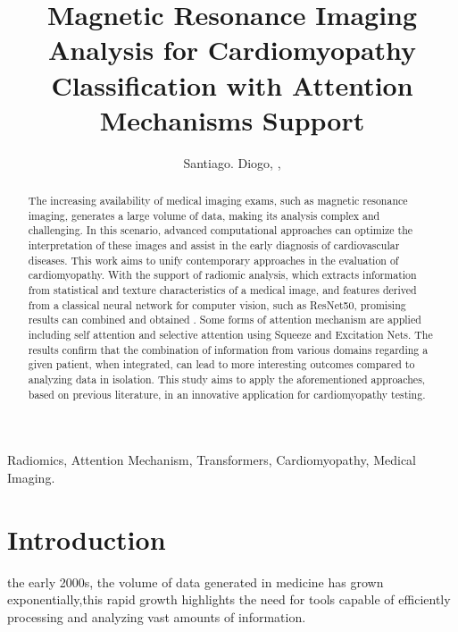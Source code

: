 \documentclass[journal,twoside,web]{ieeecolor}
\begin{document}
\title{Magnetic Resonance Imaging Analysis for Cardiomyopathy Classification with Attention Mechanisms Support}

\author{
   Santiago. Diogo, ,
   
}

\maketitle

\begin{abstract}
The increasing availability of medical imaging exams, such as magnetic resonance imaging, generates a large volume of data, making its analysis complex and challenging. In this scenario, advanced computational approaches can optimize the interpretation of these images and assist in the early diagnosis of cardiovascular diseases. This work aims to unify contemporary approaches in the evaluation of cardiomyopathy. 
With the support of radiomic analysis, which extracts information from statistical and texture characteristics of a medical image, and features derived from a classical neural network for computer vision, such as ResNet50, promising results can combined and obtained \cite{heDeepResidualLearning2015}. Some forms of attention mechanism are applied including self attention and selective attention using Squeeze and Excitation Nets.  The results confirm that the combination of information from various domains regarding a given patient, when integrated, can lead to more interesting outcomes compared to analyzing data in isolation. This study aims to apply the aforementioned approaches, based on previous literature, in an innovative application for cardiomyopathy testing.
\end{abstract}

\begin{IEEEkeywords}
Radiomics, Attention Mechanism, Transformers, Cardiomyopathy, Medical Imaging.
\end{IEEEkeywords}

\section{Introduction}
\label{sec:introduction}
 the early 2000s, the volume of data generated in medicine has grown exponentially,this rapid growth highlights the need for tools capable of efficiently processing and analyzing vast amounts of information.
\end{document}
